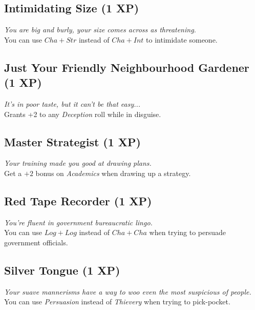 \subsection*{Intimidating Size (1 XP)}
\textit{You are big and burly, your size comes across as threatening.}\\
You can use $Cha + Str$ instead of $Cha + Int$ to intimidate someone.

\subsection*{Just Your Friendly Neighbourhood Gardener (1 XP)}
\textit{It's in poor taste, but it can't be that easy...}\\
Grants +2 to any \textit{Deception} roll while in disguise.

\subsection*{Master Strategist (1 XP)}
\textit{Your training made you good at drawing plans.}\\
Get a $+2$ bonus on \textit{Academics} when drawing up a strategy.

\subsection*{Red Tape Recorder (1 XP)}
\textit{You're fluent in government bureaucratic lingo.}\\ 
You can use $Log + Log$ instead of $Cha + Cha$ when trying to persuade government officials.

\subsection*{Silver Tongue (1 XP)}
\textit{Your suave mannerisms have a way to woo even the most suspicious of people.}\\
You can use \textit{Persuasion} instead of \textit{Thievery} when trying to pick-pocket.
